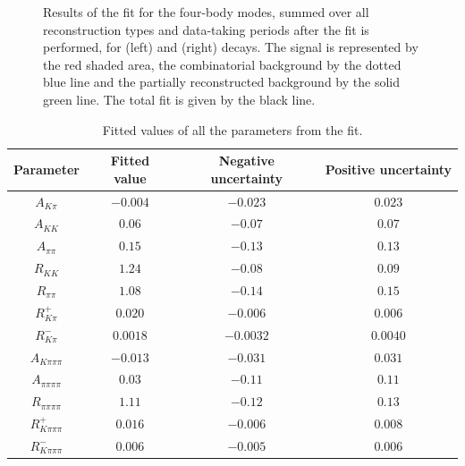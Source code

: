 \begin{figure}
\caption{Results of the \CP fit for the four-body modes, summed over all \KS reconstruction types and data-taking periods after the fit is performed, for \Bp (left) and \Bm (right) decays. The signal is represented by the red shaded area, the combinatorial background by the dotted blue line and the partially reconstructed background by the solid green line. The total fit is given by the black line.}
\label{results4body}
\end{figure}

\begin{table}[h]
\centering
{\footnotesize
\begin{tabular}{cccc}
Parameter & Fitted value & Negative uncertainty & Positive uncertainty \\
\hline
$A_{K\pi}$ & $-0.004$ & $-0.023$ & $0.023$ \\
$A_{KK}$ & $0.06$ & $-0.07$ & $0.07$ \\
$A_{\pi\pi}$ & $0.15$ & $-0.13$ & $0.13$ \\
$R_{KK}$ & $1.24$ & $-0.08$ & $0.09$ \\
$R_{\pi\pi}$ & $1.08$ & $-0.14$ & $0.15$ \\
$R^+_{K\pi}$ & $0.020$ & $-0.006$ & $0.006$ \\
$R^-_{K\pi}$ & $0.0018$ & $-0.0032$ & $0.0040$ \\
$A_{K\pi\pi\pi}$ & $-0.013$ & $-0.031$ & $0.031$ \\
$A_{\pi\pi\pi\pi}$ & $0.03$ & $-0.11$ & $0.11$ \\
$R_{\pi\pi\pi\pi}$ & $1.11$ & $-0.12$ & $0.13$ \\
$R^+_{K\pi\pi\pi}$ & $0.016$ & $-0.006$ & $0.008$ \\
$R^-_{K\pi\pi\pi}$ & $0.006$ & $-0.005$ & $0.006$ \\
\end{tabular}}
\caption{Fitted values of all the \CP parameters from the \CP fit.}
\label{cpfitresultsphysics}
\end{table}

